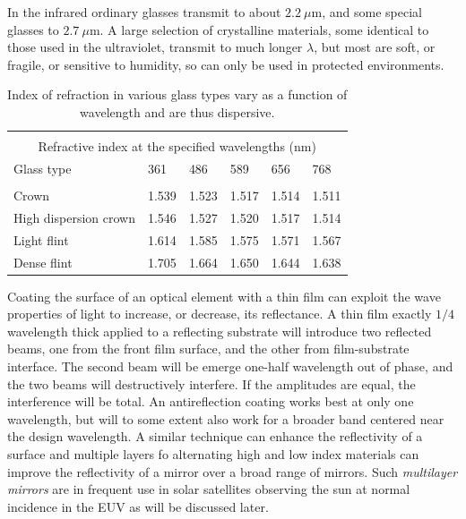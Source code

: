 In the infrared ordinary glasses transmit to about $2.2~\mu$m, and some special glasses to 
$2.7~\mu$m. A large selection of crystalline materials, some identical to those used in the
ultraviolet, transmit to much longer $\lambda$, but most are soft, or fragile, or sensitive to
humidity, so can only be used in protected environments.

\begin{table}
\centering
\begin{tabular}{llllll}
\hline\hline
& & & & & \\
\multicolumn{6}{c}{Refractive index at the specified wavelengths (nm)} \\
Glass type & 361 & 486 & 589 & 656 & 768  \\
\hline
& & & & & \\
Crown & 1.539 & 1.523 & 1.517 & 1.514 & 1.511 \\
High dispersion crown & 1.546 & 1.527 & 1.520 & 1.517 & 1.514 \\
Light flint & 1.614 & 1.585 & 1.575 & 1.571 & 1.567 \\
Dense flint & 1.705 & 1.664 & 1.650 & 1.644 & 1.638 \\
\hline
\end{tabular}
\caption{Index of refraction in various glass types vary as a function
of wavelength and are thus dispersive.}
\label{tab:glass-refraction}
\end{table}

Coating the surface of an optical element with a thin film can exploit
the wave properties of light to increase, or decrease, its
reflectance. A thin film exactly ${1/4}$ wavelength thick applied to a
reflecting substrate will introduce two reflected beams, one from the front film
surface, and the other from film-substrate interface. The second beam
will be emerge one-half wavelength out of phase, and the two beams
will destructively interfere. If the amplitudes are equal, the
interference will be total. An antireflection coating works best at only
one wavelength, but will to some extent also work for a broader band
centered near the design wavelength. A similar technique can enhance
the reflectivity of a surface and multiple layers fo alternating high
and low index materials can improve the reflectivity of a mirror over
a broad range of mirrors. Such {\it multilayer mirrors} are in
frequent use in solar satellites observing the sun at normal incidence
in the EUV as will be discussed later.


